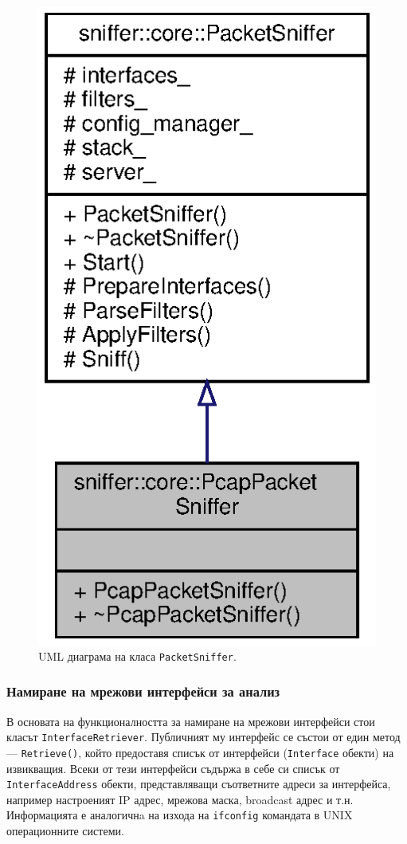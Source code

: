 \documentclass[12pt,a4paper,oneside]{book}
\begin{document}
\begin{figure}[h!]
  \centering
  \includegraphics[scale=.7]{figures/packet_sniffer_uml.eps}
  \caption{UML диаграма на класа \texttt{PacketSniffer}.}
  \label{packet_sniffer_uml_fig}
\end{figure}

\subsubsection{Намиране на мрежови интерфейси за анализ}

В основата на функционалността за намиране на мрежови интерфейси
стои класът \texttt{InterfaceRetriever}. Публичният му интерфейс се състои от
един метод --- \texttt{Retrieve()}, който предоставя списък от интерфейси
(\texttt{Interface} обекти) на извикващия. Всеки от тези интерфейси съдържа в
себе си списък от \texttt{InterfaceAddress} обекти, представляващи съответните
адреси за интерфейса, например настроеният IP адрес, мрежова маска,
broadcast адрес и т.н. Информацията е аналогичнa на изхода на \texttt{ifconfig} командата
в UNIX операционните системи.
\end{document}
